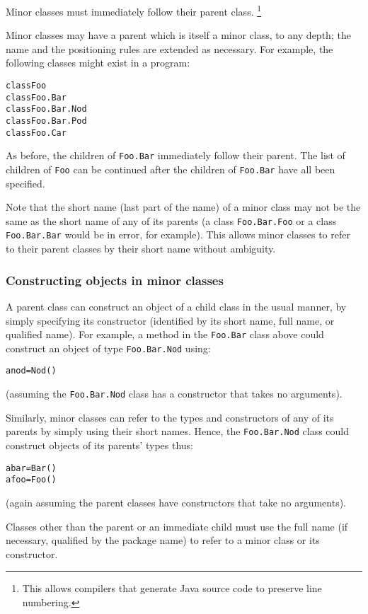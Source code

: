 Minor classes must immediately follow their parent class.
\footnote{
This allows compilers that generate Java source code to preserve line
numbering.
}
 
Minor classes may have a parent which is itself a minor class,
to any depth; the name and the positioning rules are extended as
necessary.  For example, the following classes might exist in a program:
\begin{alltt}
class Foo
  class Foo.Bar
    class Foo.Bar.Nod
    class Foo.Bar.Pod
  class Foo.Car
\end{alltt}
 
As before, the children of \texttt{Foo.Bar} immediately follow their
parent.  The list of children of \texttt{Foo} can be continued after
the children of \texttt{Foo.Bar} have all been specified.
 
Note that the short name (last part of the name) of a minor class may
not be the same as the short name of any of its parents (a
class \texttt{Foo.Bar.Foo} or a class \texttt{Foo.Bar.Bar} would be in
error, for example).  This allows minor classes to refer to their parent
classes by their short name without ambiguity.
\subsubsection{Constructing objects in minor classes}
 
A parent class can construct an object of a child class in the usual
manner, by simply specifying its constructor (identified by its short
name, full name, or qualified name).
For example, a method in the \texttt{Foo.Bar} class above could construct
an object of type \texttt{Foo.Bar.Nod} using:
\begin{alltt}
anod=Nod()
\end{alltt}
(assuming the \texttt{Foo.Bar.Nod} class has a constructor that takes no
arguments).
 
Similarly, minor classes can refer to the types and constructors of any
of its parents by simply using their short names.
Hence, the \texttt{Foo.Bar.Nod} class could construct objects of its
parents' types thus:
\begin{alltt}
abar=Bar()
afoo=Foo()
\end{alltt}
(again assuming the parent classes have constructors that take no
arguments).
 
Classes other than the parent or an immediate child must use the full
name (if necessary, qualified by the package name) to refer to a minor
class or its constructor.
